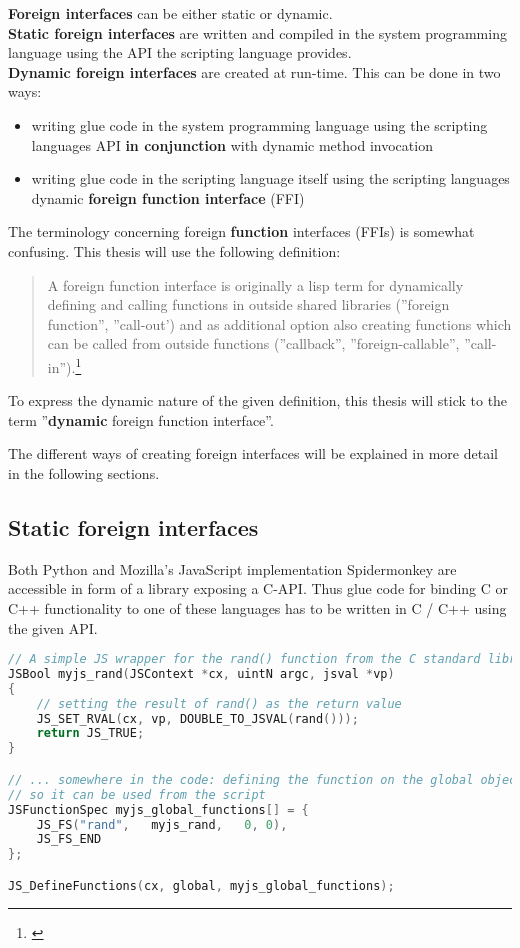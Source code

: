 \textbf{Foreign interfaces} can be either static or dynamic.\\
\textbf{Static foreign interfaces} are written and compiled in the system programming language using the API the scripting language provides.\\
\textbf{Dynamic foreign interfaces} are created at run-time. This can be done in two ways:
\begin{itemize}
\item writing glue code in the system programming language using the scripting languages API \textbf{in conjunction} with dynamic method invocation
\item writing glue code in the scripting language itself using the scripting languages dynamic \textbf{foreign function interface} (FFI)
\end{itemize}

The terminology concerning foreign \textbf{function} interfaces (FFIs) is somewhat confusing. This thesis will use the following definition:

\begin{quotation}
A foreign function interface is originally a lisp term for dynamically defining and calling functions in outside shared libraries (''foreign function'', ''call-out') and as additional option also creating functions which can be called from outside functions (''callback'', ''foreign-callable'', ''call-in'').\footnote{\citep{DesignFFI}}
\end{quotation}

To express the dynamic nature of the given definition, this thesis will stick to the term ''\textbf{dynamic} foreign function interface''.

The different ways of creating foreign interfaces will be explained in more detail in the following sections.

\newpage
\subsection{Static foreign interfaces}

Both Python and Mozilla's JavaScript implementation Spidermonkey are accessible in form of a library exposing a C-API. Thus glue code for binding C or C++ functionality to one of these languages has to be written in C / C++ using the given API.

\begin{lstlisting}[language=C++, caption=Exposing a C function to Spidermonkey (taken from MDN)]
// A simple JS wrapper for the rand() function from the C standard library
JSBool myjs_rand(JSContext *cx, uintN argc, jsval *vp)
{
    // setting the result of rand() as the return value
    JS_SET_RVAL(cx, vp, DOUBLE_TO_JSVAL(rand()));
    return JS_TRUE;
}

// ... somewhere in the code: defining the function on the global object
// so it can be used from the script
JSFunctionSpec myjs_global_functions[] = {
    JS_FS("rand",   myjs_rand,   0, 0),
    JS_FS_END
};

JS_DefineFunctions(cx, global, myjs_global_functions);
\end{lstlisting}

